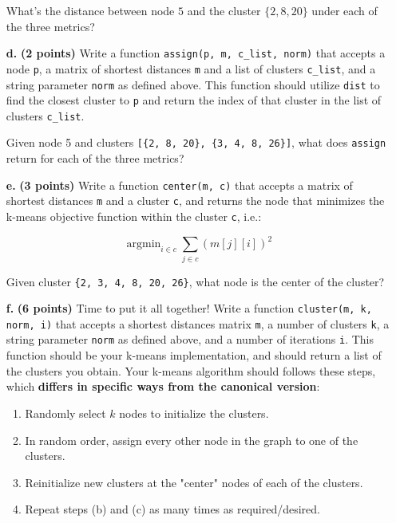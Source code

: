 \documentclass[11pt]{article}
\DeclareMathOperator*{\argmin}{argmin}
\newcommand{\code}[1]{\texttt{#1}}
\begin{document}
\begin{enumerate}
    What's the distance between node $5$ and the cluster $\{2, 8, 20\}$ under each of the three metrics?

    \item[\textbf{d.}] \textbf{(2 points)} Write a function \code{assign(p, m, c\_list, norm)} that accepts a node \code{p}, a matrix of shortest distances \code{m} and a list of clusters \code{c\_list}, and a string parameter \code{norm} as defined above. This function should utilize \code{dist} to find the closest cluster to \code{p} and return the index of that cluster in the list of clusters \code{c\_list}.

    Given node 5 and clusters \code{[\{2, 8, 20\}, \{3, 4, 8, 26\}]}, what does \code{assign} return for each of the three metrics?

    \item[\textbf{e.}] \textbf{(3 points)} Write a function \code{center(m, c)} that accepts a matrix of shortest distances \code{m} and a cluster \code{c}, and returns the node that minimizes the k-means objective function within the cluster \code{c}, i.e.:

    $$ \argmin_{i\in c}\sum_{j\in c}\left(m[j][i]\right)^2 $$

    Given cluster \code{\{2, 3, 4, 8, 20, 26\}}, what node is the center of the cluster?

    \item[\textbf{f.}] \textbf{(6 points)} Time to put it all together! Write a function \code{cluster(m, k, norm, i)} that accepts a shortest distances matrix \code{m}, a number of clusters \code{k}, a string parameter \code{norm} as defined above, and a number of iterations \code{i}. This function should be your k-means implementation, and should return a list of the clusters you obtain. Your k-means algorithm should follows these steps, which \textbf{differs in specific ways from the canonical version}:

    \begin{enumerate}
        \item Randomly select $k$ nodes to initialize the clusters.
        \item In random order, assign every other node in the graph to one of the clusters.
        \item Reinitialize new clusters at the "center" nodes of each of the clusters.
        \item Repeat steps (b) and (c) as many times as required/desired.
    \end{enumerate}


\end{enumerate}
\end{document}
